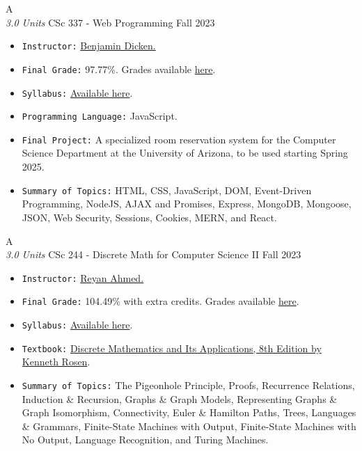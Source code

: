 \cventry
{A \\ \small{\textit{3.0 Units}}}
{CSc 337 - Web Programming}
{Fall 2023}
{}
{}
{
  \begin{itemize}
    \item \texttt{Instructor:} \href{https://benjdd.com/}{Benjamin Dicken.}
    \item \texttt{Final Grade:} 97.77\%. Grades available \href{https://mhrezaei.com/assets/cv/courses/Fall2023/CSC337/Grades.pdf}{here}.
    \item \texttt{Syllabus:} \href{https://mhrezaei.com/assets/cv/courses/Fall2023/CSC337/Syllabus.pdf}{Available here}.
    \item \texttt{Programming Language:} JavaScript.
    \item \texttt{Final Project:} A specialized room reservation system for the Computer Science Department at the University of Arizona, to be used starting Spring 2025.
    \item \texttt{Summary of Topics:} HTML, CSS, JavaScript, DOM, Event-Driven Programming, NodeJS, AJAX and Promises, Express, MongoDB, Mongoose, JSON, Web Security, Sessions, Cookies, MERN, and React.
  \end{itemize}
}

\cventry
{A \\ \small{\textit{3.0 Units}}}
{CSc 244 - Discrete Math for Computer Science II}
{Fall 2023}
{}
{}
{
  \begin{itemize}
    \item \texttt{Instructor:} \href{https://www.cs.arizona.edu/person/reyan-ahmed}{Reyan Ahmed.}
    \item \texttt{Final Grade:} 104.49\% with extra credits. Grades available \href{https://mhrezaei.com/assets/cv/courses/Fall2023/CSC244/Grades.pdf}{here}.
    \item \texttt{Syllabus:} \href{https://mhrezaei.com/assets/cv/courses/Fall2023/CSC244/Syllabus.pdf}{Available here}.
    \item \texttt{Textbook:} \href{https://www.mheducation.com/highered/product/M125967651X.html}{Discrete Mathematics and Its Applications, 8th Edition by Kenneth Rosen}.
    \item \texttt{Summary of Topics:} The Pigeonhole Principle, Proofs, Recurrence Relations, Induction \& Recursion, Graphs \& Graph Models, Representing Graphs \& Graph Isomorphism, Connectivity, Euler \& Hamilton Paths, Trees, Languages \& Grammars, Finite-State Machines with Output, Finite-State Machines with No Output, Language Recognition, and Turing Machines.
  \end{itemize}
}

